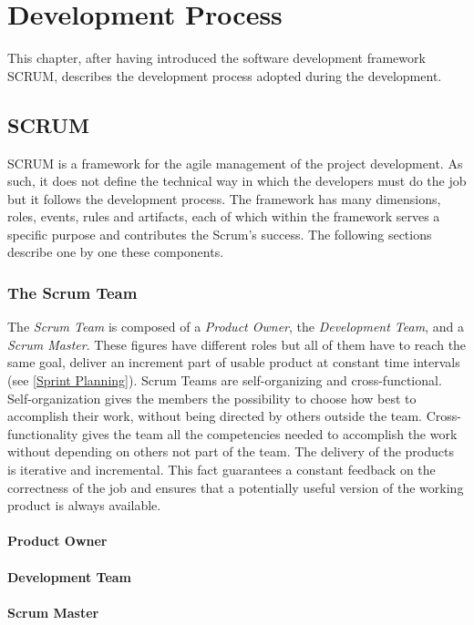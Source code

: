 \chapter{Development Process}
This chapter, after having introduced the software development framework SCRUM, describes the development process adopted during the development.

	\section{SCRUM}
	SCRUM is a framework for the agile management of the project development. 
	As such, it does not define the technical way in which the developers must do the job but it follows the development process. 	
	The framework has many dimensions, roles, events, rules and artifacts, each of which within the framework serves a specific purpose and contributes the Scrum's success. The following sections describe one by one these components.

		\subsection{The Scrum Team}
		The \emph{Scrum Team} is composed of a \emph{Product Owner}, the \emph{Development Team}, and a \emph{Scrum Master}.
		These figures have different roles but all of them have to reach the same goal, deliver an increment part of usable product at constant time intervals (see \ref{Sprint Planning}). Scrum Teams are self-organizing and cross-functional. Self-organization gives the members the possibility to choose how best to accomplish their work, without being directed by others outside the team. Cross-functionality gives the team all the competencies needed to accomplish the work without depending on others not part of the team. The delivery of the products is iterative and incremental. This fact guarantees a constant feedback on the correctness of the job and ensures that a potentially useful version of the working product is always available.
			\subsubsection{Product Owner}

			\subsubsection{Development Team}
			\subsubsection{Scrum Master}





